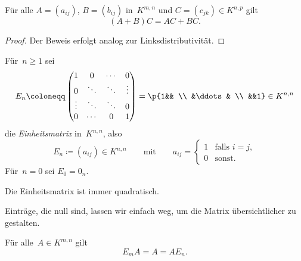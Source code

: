 \documentclass[a4paper]{article}
\begin{document}
\begin{lemma}[Rechtsdistributitvität]\label{lem:matrix:dr}
    Für alle $A = (a_{ij})$, $B = (b_{ij})$ in~$K^{m,n}$ und $C = (c_{jk}) \in K^{n,p}$ gilt
    \begin{equation*}
        (A+B)C = AC+BC.
    \end{equation*}
\end{lemma}

\begin{proof}
    Der Beweis erfolgt analog zur Linksdistributivität.
\end{proof}

\begin{definition}[Einheitsmatrix]
    Für~$n \geq 1$ sei
    \begin{equation*}
        E_n \coloneqq \begin{pmatrix}
            1      & 0      & \cdots & 0      \\
            0      & \ddots & \ddots & \vdots \\
            \vdots & \ddots & \ddots & 0      \\
            0      & \cdots & 0      & 1
        \end{pmatrix}
        = \p{1&& \\ &\ddots& \\ &&1} \in K^{n,n}
    \end{equation*}
    die \emph{Einheitsmatrix} in~$K^{n,n}$, also
    \begin{equation*}
        E_n \coloneqq (a_{ij}) \in K^{n,n} \qquad\text{mit}\qquad a_{ij} =
        \begin{cases}
            1 & \text{falls } i = j, \\
            0 & \text{sonst}.
        \end{cases}
    \end{equation*}
    Für~$n = 0$ sei $E_0 = 0_n$.
\end{definition}

Die Einheitsmatrix ist immer quadratisch.

Einträge, die null sind, lassen wir einfach weg, um die Matrix übersichtlicher zu gestalten.

\begin{lemma}[Einselement]\label{lem:matrix:mn}
    Für alle~$A \in K^{m,n}$ gilt
    \begin{equation*}
        E_mA = A = AE_n.
    \end{equation*}
\end{lemma}
\end{document}
